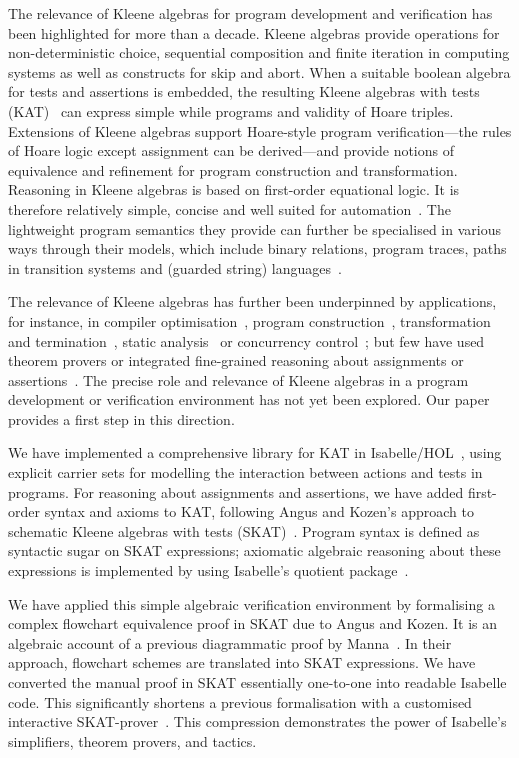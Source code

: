 \documentclass{llncs}
\begin{document}
The relevance of Kleene algebras for program development and
verification has been highlighted for more than a decade. Kleene
algebras provide operations for non-deterministic choice, sequential
composition and finite iteration in computing systems as well as
constructs for skip and abort. When a suitable boolean algebra for
tests and assertions is embedded, the resulting Kleene algebras with
tests (KAT)~\cite{Kozen97} can express simple while programs and
validity of Hoare triples. Extensions of Kleene algebras support
Hoare-style program verification---the rules of Hoare logic except
assignment can be derived---and provide notions of equivalence and
refinement for program construction and transformation. Reasoning in
Kleene algebras is based on first-order equational logic. It is
therefore relatively simple, concise and well suited for
automation~\cite{HoefnerStruthAuto,FosterStruth,GuttmannStruthWeber,ArmstrongRAMICS}. The
lightweight program semantics they provide can further be specialised
in various ways through their models, which include binary relations,
program traces, paths in transition systems and (guarded string)
languages~\cite{Archive}.

The relevance of Kleene algebras has further been underpinned by
applications, for instance, in compiler
optimisation~\cite{KozenPatron}, program
construction~\cite{BerghammerStruth}, transformation and
termination~\cite{DesharnaisMoellerStruth11}, static
analysis~\cite{DesharnaisFernandes} or concurrency
control~\cite{Cohen}; but few have used theorem provers or integrated
fine-grained reasoning about assignments or
assertions~\cite{Aboul-Hosn,BerghammerStruth,GuttmannStruthWeber2}. The
precise role and relevance of Kleene algebras in a program development
or verification environment has not yet been explored. Our paper
provides a first step in this direction.

We have implemented a comprehensive library for KAT in
Isabelle/HOL~\cite{NipkowPaulsonWenzel2002}, using explicit carrier sets for
modelling the interaction between actions and tests in programs. For
reasoning about assignments and assertions, we have added first-order
syntax and axioms to KAT, following Angus and Kozen's approach to
schematic Kleene algebras with tests (SKAT)~\cite{Angus}. Program
syntax is defined as syntactic sugar on SKAT expressions; axiomatic
algebraic reasoning about these expressions is implemented by using
Isabelle's quotient package~\cite{Kaliszyk}.

We have applied this simple algebraic verification environment by
formalising a complex flowchart equivalence proof in SKAT due to Angus
and Kozen. It is an algebraic account of a previous diagrammatic proof
by Manna~\cite{Manna}. In their approach, flowchart schemes are translated
into SKAT expressions.  We have converted the manual proof in SKAT
essentially one-to-one into readable Isabelle code. This significantly
shortens a previous formalisation with a customised interactive
SKAT-prover~\cite{Aboul-Hosn}. This compression demonstrates the power of
Isabelle's simplifiers, theorem provers, and tactics.
\end{document}
